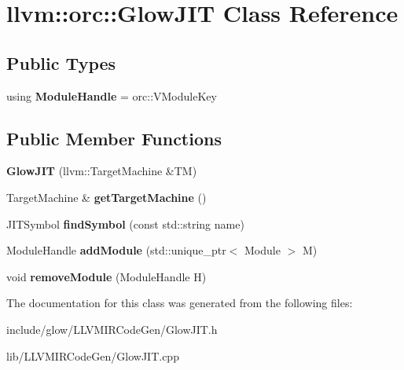 \hypertarget{classllvm_1_1orc_1_1_glow_j_i_t}{}\section{llvm\+:\+:orc\+:\+:Glow\+J\+IT Class Reference}
\label{classllvm_1_1orc_1_1_glow_j_i_t}
\subsection*{Public Types}
\begin{DoxyCompactItemize}
\item 
\mbox{\label{classllvm_1_1orc_1_1_glow_j_i_t_ac48c0e30a4c06be3cc7a664bf0b68613}} 
using {\bfseries Module\+Handle} = orc\+::\+V\+Module\+Key
\end{DoxyCompactItemize}
\subsection*{Public Member Functions}
\begin{DoxyCompactItemize}
\item 
\mbox{\label{classllvm_1_1orc_1_1_glow_j_i_t_a18d3a0a0d1770cfe9f755a8c17d8c585}} 
{\bfseries Glow\+J\+IT} (llvm\+::\+Target\+Machine \&TM)
\item 
\mbox{\label{classllvm_1_1orc_1_1_glow_j_i_t_ae0089554281a32fdbce9ea0838d7a8c1}} 
Target\+Machine \& {\bfseries get\+Target\+Machine} ()
\item 
\mbox{\label{classllvm_1_1orc_1_1_glow_j_i_t_ae240bd924968fa3fc87b6ee695c43cf2}} 
J\+I\+T\+Symbol {\bfseries find\+Symbol} (const std\+::string name)
\item 
\mbox{\label{classllvm_1_1orc_1_1_glow_j_i_t_af34eb642f2ead39a325f8d8e0bbc832a}} 
Module\+Handle {\bfseries add\+Module} (std\+::unique\+\_\+ptr$<$ Module $>$ M)
\item 
\mbox{\label{classllvm_1_1orc_1_1_glow_j_i_t_a40cab83c2fbf28ee474ca168a846eef9}} 
void {\bfseries remove\+Module} (Module\+Handle H)
\end{DoxyCompactItemize}


The documentation for this class was generated from the following files\+:\begin{DoxyCompactItemize}
\item 
include/glow/\+L\+L\+V\+M\+I\+R\+Code\+Gen/Glow\+J\+I\+T.\+h\item 
lib/\+L\+L\+V\+M\+I\+R\+Code\+Gen/Glow\+J\+I\+T.\+cpp\end{DoxyCompactItemize}
